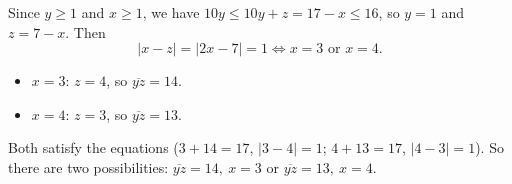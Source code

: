 Since $y\ge1$ and $x\ge1$, we have $10y\le10y+z=17-x\le16$, so $y=1$ and $z=7-x$. Then
\[|x-z|=|2x-7|=1\iff x=3\text{ or }x=4.\]
\begin{itemize}
\item $x=3$: $z=4$, so $\overline{yz}=14$.
\item $x=4$: $z=3$, so $\overline{yz}=13$.
\end{itemize}
Both satisfy the equations ($3+14=17$, $|3-4|=1$; $4+13=17$, $|4-3|=1$). So there are two possibilities: $\boxed{\overline{yz}=14,\ x=3}$ or $\boxed{\overline{yz}=13,\ x=4}$.
